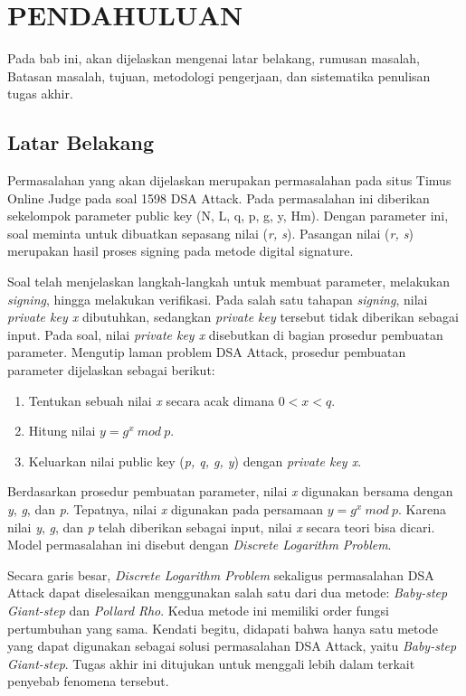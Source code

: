 \vspace{0ex}
\chapter {PENDAHULUAN}

Pada bab ini, akan dijelaskan mengenai latar belakang, rumusan masalah, Batasan masalah, tujuan, metodologi pengerjaan, dan sistematika penulisan tugas akhir.

\section{Latar Belakang}

\par Permasalahan yang akan dijelaskan merupakan permasalahan pada situs Timus Online Judge pada soal 1598 DSA Attack. Pada permasalahan ini diberikan sekelompok parameter public key (N, L, q, p, g, y, Hm). Dengan parameter ini, soal meminta untuk dibuatkan sepasang nilai (\textit{r, s}). Pasangan nilai (\textit{r, s}) merupakan hasil proses signing pada metode digital signature.

Soal telah menjelaskan langkah-langkah untuk membuat parameter, melakukan \textit{signing}, hingga melakukan verifikasi. Pada salah satu tahapan \textit{signing}, nilai \textit{private key x} dibutuhkan, sedangkan \textit{private key} tersebut tidak diberikan sebagai input. Pada soal, nilai \textit{private key x} disebutkan di bagian prosedur pembuatan parameter. Mengutip laman problem DSA Attack, prosedur pembuatan parameter dijelaskan sebagai berikut:

\begin{enumerate}
\item Tentukan sebuah nilai \textit{x} secara acak dimana $0 < x < q$.
\item Hitung nilai $y = g^x\ mod\ p$.
\item Keluarkan nilai public key (\textit{p, q, g, y}) dengan \textit{private key x}.
\end{enumerate}

Berdasarkan prosedur pembuatan parameter, nilai \textit{x} digunakan bersama dengan \textit{y}, \textit{g}, dan \textit{p}. Tepatnya, nilai \textit{x} digunakan pada persamaan $y = g^x\ mod\ p$. Karena nilai \textit{y}, \textit{g}, dan \textit{p} telah diberikan sebagai input, nilai \textit{x} secara teori bisa dicari. Model permasalahan ini disebut dengan \textit{Discrete Logarithm Problem}.

Secara garis besar, \textit{Discrete Logarithm Problem} sekaligus permasalahan DSA Attack dapat diselesaikan menggunakan salah satu dari dua metode: \textit{Baby-step Giant-step} dan \textit{Pollard Rho}. Kedua metode ini memiliki order fungsi pertumbuhan yang sama. Kendati begitu, didapati bahwa hanya satu metode yang dapat digunakan sebagai solusi permasalahan DSA Attack, yaitu \textit{Baby-step Giant-step}. Tugas akhir ini ditujukan untuk menggali lebih dalam terkait penyebab fenomena tersebut.


